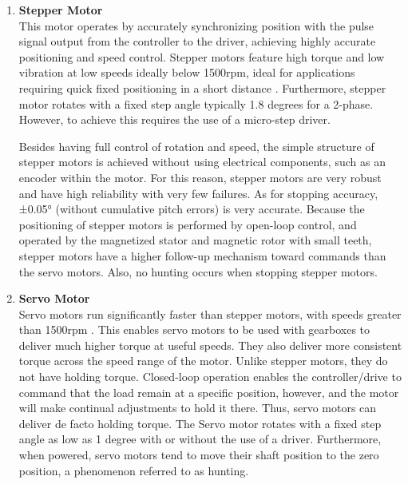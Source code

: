 \begin{enumerate}
    \item \textbf{Stepper Motor}\\
    This motor operates by accurately synchronizing position with the pulse signal output from the controller to the driver, achieving highly accurate positioning and speed control. Stepper motors feature high torque and low vibration at low speeds ideally below 1500rpm, ideal for applications requiring quick fixed positioning in a short distance \cite{wargula2017investigations}. Furthermore, stepper motor rotates with a fixed step angle typically 1.8 degrees for a 2-phase. However, to achieve this requires the use of a micro-step driver.
    \par
    Besides having full control of rotation and speed, the simple structure of stepper motors is achieved without using electrical components, such as an encoder within the motor. For this reason, stepper motors are very robust and have high reliability with very few failures. As for stopping accuracy, ±0.05° (without cumulative pitch errors) is very accurate\cite{wargula2017investigations}. Because the positioning of stepper motors is performed by open-loop control, and operated by the magnetized stator and magnetic rotor with small teeth, stepper motors have a higher follow-up mechanism toward commands than the servo motors. Also, no hunting occurs when stopping stepper motors.
    \item \textbf{Servo Motor}\\
    Servo motors run significantly faster than stepper motors, with speeds greater than 1500rpm \cite{halicioglu2016mechanisms}. This enables servo motors to be used with gearboxes to deliver much higher torque at useful speeds. They also deliver more consistent torque across the speed range of the motor. Unlike stepper motors, they do not have holding torque. Closed-loop operation enables the controller/drive to command that the load remain at a specific position, however, and the motor will make continual adjustments to hold it there. Thus, servo motors can deliver de facto holding torque\cite{halicioglu2016mechanisms}. The Servo motor rotates with a fixed step angle as low as 1 degree with or without the use of a driver. Furthermore, when powered, servo motors tend to move their shaft position to the zero position, a phenomenon referred to as hunting.
\end{enumerate}
